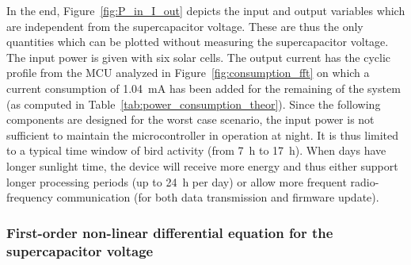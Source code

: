 \documentclass{EPL-master-thesis-covers-EN}
\begin{document}
In the end, Figure~\ref{fig:P_in_I_out} depicts the input and output variables which are independent from the supercapacitor voltage. These are thus the only quantities which can be plotted without measuring the supercapacitor voltage. The input power is given with six solar cells. The output current has the cyclic profile from the MCU analyzed in Figure~\ref{fig:consumption_fft} on which a current consumption of \SI{1.04}{mA} has been added for the remaining of the system (as computed in Table~\ref{tab:power_consumption_theor}). Since the following components are designed for the worst case scenario, the input power is not sufficient to maintain the microcontroller in operation at night. It is thus limited to a typical time window of bird activity (from \SI{7}{h} to \SI{17}{h}). When days have longer sunlight time, the device will receive more energy and thus either support longer processing periods (up to \SI{24}{h} per day) or allow more frequent radio-frequency communication (for both data transmission and firmware update).

\subsubsection*{First-order non-linear differential equation for the supercapacitor voltage}
\end{document}
